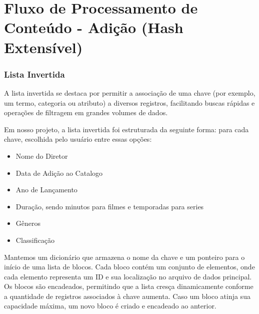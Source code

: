 \documentclass[12pt]{article}
\begin{document}
\section*{Fluxo de Processamento de Conteúdo - Adição (Hash Extensível)} 
\begin{center} 
\end{center}

\subsubsection{Lista Invertida}
A lista invertida se destaca por permitir a associação de uma chave (por exemplo, um termo, categoria ou atributo) a diversos registros, facilitando buscas rápidas e operações de filtragem em grandes volumes de dados.

Em nosso projeto, a lista invertida foi estruturada da seguinte forma: para cada chave, escolhida pelo usuário entre essas opções:

\begin{itemize}
  \item Nome do Diretor
  \item Data de Adição ao Catalogo
  \item Ano de Lançamento
  \item Duração, sendo minutos para filmes e temporadas para series
  \item Gêneros
  \item Classificação
\end{itemize}

Mantemos um dicionário que armazena o nome da chave e um ponteiro para o início de uma lista de blocos. Cada bloco contém um conjunto de elementos, onde cada elemento representa um ID e sua localização no arquivo de dados principal. Os blocos são encadeados, permitindo que a lista cresça dinamicamente conforme a quantidade de registros associados à chave aumenta. Caso um bloco atinja sua capacidade máxima, um novo bloco é criado e encadeado ao anterior.
\end{document}
